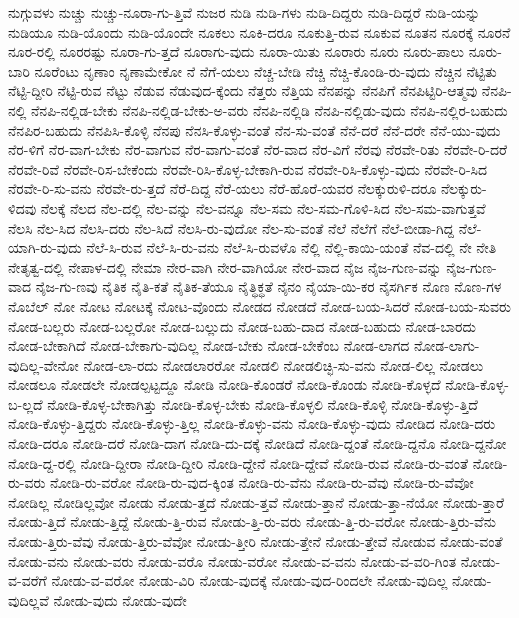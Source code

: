 {ನುಗ್ಗುವಳು
ನುಚ್ಚು
ನುಚ್ಚು-ನೂರಾ-ಗು-ತ್ತಿವೆ
ನುಜರ
ನುಡಿ
ನುಡಿ-ಗಳು
ನುಡಿ-ದಿದ್ದರು
ನುಡಿ-ದಿದ್ದರೆ
ನುಡಿ-ಯನ್ನು
ನುಡಿಯೂ
ನುಡಿ-ಯೊಂದು
ನುಡಿ-ಯೊಂದೇ
ನೂಕಲು
ನೂಕಿ-ದರೂ
ನೂಕುತ್ತಿ-ರುವ
ನೂಕುವ
ನೂತನ
ನೂರಕ್ಕೆ
ನೂರನೆ
ನೂರ-ರಲ್ಲಿ
ನೂರರಷ್ಟು
ನೂರಾ-ಗು-ತ್ತದೆ
ನೂರಾಗು-ವುದು
ನೂರಾ-ಯಿತು
ನೂರಾರು
ನೂರು
ನೂರು-ಪಾಲು
ನೂರು-ಬಾರಿ
ನೂರೆಂಟು
ನೃಣಾಂ
ನೃಣಾಮೇಕೋ
ನೆ
ನೆಗೆ-ಯಲು
ನೆಚ್ಚ-ಬೇಡಿ
ನೆಚ್ಚಿ
ನೆಚ್ಚಿ-ಕೊಂಡಿ-ರು-ವುದು
ನೆಚ್ಚಿನ
ನೆಟ್ಟಿತು
ನೆಟ್ಟಿ-ದ್ದೀರಿ
ನೆಟ್ಟಿ-ರುವ
ನೆಟ್ಟು
ನೆಡುವ
ನೆಡುವುದ-ಕ್ಕೆಂದು
ನೆತ್ತರು
ನೆತ್ತಿಯ
ನೆನಪನ್ನು
ನೆನಪಿಗೆ
ನೆನಪಿಟ್ಟಿರಿ-ಆತ್ಮವು
ನೆನಪಿ-ನಲ್ಲಿ
ನೆನಪಿ-ನಲ್ಲಿಡ-ಬೇಕು
ನೆನಪಿ-ನಲ್ಲಿಡ-ಬೇಕು-ಅ-ವರು
ನೆನಪಿ-ನಲ್ಲಿಡಿ
ನೆನಪಿ-ನಲ್ಲಿಡು-ವುದು
ನೆನಪಿ-ನಲ್ಲಿರ-ಬಹುದು
ನೆನಪಿರ-ಬಹುದು
ನೆನಪಿಸಿ-ಕೊಳ್ಳಿ
ನೆನಪು
ನೆನಸಿ-ಕೊಳ್ಳು-ವಂತೆ
ನೆನ-ಸು-ವಂತೆ
ನೆನೆ-ದರೆ
ನೆನೆ-ದರೇ
ನೆನೆ-ಯು-ವುದು
ನೆರ-ಳಿಗೆ
ನೆರ-ವಾಗ-ಬೇಕು
ನೆರ-ವಾಗುವ
ನೆರ-ವಾಗು-ವಂತೆ
ನೆರ-ವಾದ
ನೆರ-ವಿಗೆ
ನೆರವು
ನೆರವೇ-ರಿತು
ನೆರವೇ-ರಿ-ದರೆ
ನೆರವೇ-ರಿವೆ
ನೆರವೇ-ರಿಸ-ಬೇಕೆಂದು
ನೆರವೇ-ರಿಸಿ-ಕೊಳ್ಳ-ಬೇಕಾಗಿ-ರುವ
ನೆರವೇ-ರಿಸಿ-ಕೊಳ್ಳು-ವುದು
ನೆರವೇ-ರಿ-ಸಿದ
ನೆರವೇ-ರಿ-ಸು-ವನು
ನೆರವೇ-ರು-ತ್ತದೆ
ನೆರೆ-ದಿದ್ದ
ನೆರೆ-ಯಲು
ನೆರೆ-ಹೊರೆ-ಯವರ
ನೆಲಕ್ಕುರುಳಿ-ದರೂ
ನೆಲಕ್ಕುರು-ಳಿದವು
ನೆಲಕ್ಕೆ
ನೆಲದ
ನೆಲ-ದಲ್ಲಿ
ನೆಲ-ವನ್ನು
ನೆಲ-ವನ್ನೂ
ನೆಲ-ಸಮ
ನೆಲ-ಸಮ-ಗೊಳಿ-ಸಿದ
ನೆಲ-ಸಮ-ವಾಗುತ್ತವೆ
ನೆಲಸಿ
ನೆಲ-ಸಿದ
ನೆಲಸಿ-ದರು
ನೆಲ-ಸಿದೆ
ನೆಲಸಿ-ರು-ವುದೋ
ನೆಲ-ಸು-ವಂತೆ
ನೆಲೆ
ನೆಲೆಗೆ
ನೆಲೆ-ಬೀಡಾ-ಗಿದ್ದ
ನೆಲೆ-ಯಾಗಿ-ರು-ವುದು
ನೆಲೆ-ಸಿ-ರುವ
ನೆಲೆ-ಸಿ-ರು-ವನು
ನೆಲೆ-ಸಿ-ರುವಳೊ
ನೆಲ್ಲಿ
ನೆಲ್ಲಿ-ಕಾಯಿ-ಯಂತೆ
ನೆವ-ದಲ್ಲಿ
ನೇ
ನೇತಿ
ನೇತೃತ್ವ-ದಲ್ಲಿ
ನೇಪಾಳ-ದಲ್ಲಿ
ನೇಮಾ
ನೇರ-ವಾಗಿ
ನೇರ-ವಾಗಿಯೋ
ನೇರ-ವಾದ
ನೈಜ
ನೈಜ-ಗುಣ-ವನ್ನು
ನೈಜ-ಗುಣ-ವಾದ
ನೈಜ-ಗು-ಣವು
ನೈತಿಕ
ನೈತಿ-ಕತೆ
ನೈತಿಕ-ತೆಯೂ
ನೈತ್ಧಿಕ್ಧತೆ
ನೈನಂ
ನೈಯಾ-ಯಿ-ಕರ
ನೈಸರ್ಗಿಕ
ನೊಣ
ನೊಣ-ಗಳ
ನೊಬೆಲ್
ನೋ
ನೋಟ
ನೋಟಕ್ಕೆ
ನೋಟ-ವೊಂದು
ನೋಡದ
ನೋಡದೆ
ನೋಡ-ಬಯ-ಸಿದರೆ
ನೋಡ-ಬಯ-ಸುವರು
ನೋಡ-ಬಲ್ಲರು
ನೋಡ-ಬಲ್ಲರೋ
ನೋಡ-ಬಲ್ಲುದು
ನೋಡ-ಬಹು-ದಾದ
ನೋಡ-ಬಹುದು
ನೋಡ-ಬಾರದು
ನೋಡ-ಬೇಕಾಗಿದೆ
ನೋಡ-ಬೇಕಾಗು-ವುದಿಲ್ಲ
ನೋಡ-ಬೇಕು
ನೋಡ-ಬೇಕೆಂಬ
ನೋಡ-ಲಾಗದ
ನೋಡ-ಲಾಗು-ವುದಿಲ್ಲ-ವೇನೋ
ನೋಡ-ಲಾ-ರದು
ನೋಡಲಾರರೋ
ನೋಡಲಿ
ನೋಡಲಿಚ್ಛಿ-ಸು-ವನು
ನೋಡ-ಲಿಲ್ಲ
ನೋಡಲು
ನೋಡಲೂ
ನೋಡಲೇ
ನೋಡಲ್ಪಟ್ಟದ್ದೂ
ನೋಡಿ
ನೋಡಿ-ಕೊಂಡರೆ
ನೋಡಿ-ಕೊಂಡು
ನೋಡಿ-ಕೊಳ್ಳದೆ
ನೋಡಿ-ಕೊಳ್ಳ-ಬ-ಲ್ಲದೆ
ನೋಡಿ-ಕೊಳ್ಳ-ಬೇಕಾಗಿತ್ತು
ನೋಡಿ-ಕೊಳ್ಳ-ಬೇಕು
ನೋಡಿ-ಕೊಳ್ಳಲಿ
ನೋಡಿ-ಕೊಳ್ಳಿ
ನೋಡಿ-ಕೊಳ್ಳು-ತ್ತಿದೆ
ನೋಡಿ-ಕೊಳ್ಳು-ತ್ತಿದ್ದರು
ನೋಡಿ-ಕೊಳ್ಳು-ತ್ತಿಲ್ಲ
ನೋಡಿ-ಕೊಳ್ಳು-ವನು
ನೋಡಿ-ಕೊಳ್ಳು-ವುದು
ನೋಡಿದ
ನೋಡಿ-ದರು
ನೋಡಿ-ದರೂ
ನೋಡಿ-ದರೆ
ನೋಡಿ-ದಾಗ
ನೋಡಿ-ದು-ದಕ್ಕೆ
ನೋಡಿದೆ
ನೋಡಿ-ದ್ದಂತೆ
ನೋಡಿ-ದ್ದನೊ
ನೋಡಿ-ದ್ದನೋ
ನೋಡಿ-ದ್ದ-ರಲ್ಲಿ
ನೋಡಿ-ದ್ದೀರಾ
ನೋಡಿ-ದ್ದೀರಿ
ನೋಡಿ-ದ್ದೇನೆ
ನೋಡಿ-ದ್ದೇವೆ
ನೋಡಿ-ರುವ
ನೋಡಿ-ರು-ವಂತೆ
ನೋಡಿ-ರು-ವರು
ನೋಡಿ-ರು-ವರೋ
ನೋಡಿ-ರು-ವುದ-ಕ್ಕಿಂತ
ನೋಡಿ-ರು-ವೆನು
ನೋಡಿ-ರು-ವೆವು
ನೋಡಿ-ರು-ವೆವೋ
ನೋಡಿಲ್ಲ
ನೋಡಿಲ್ಲವೋ
ನೋಡು
ನೋಡು-ತ್ತದೆ
ನೋಡು-ತ್ತವೆ
ನೋಡು-ತ್ತಾನೆ
ನೋಡು-ತ್ತಾ-ನೆಯೋ
ನೋಡು-ತ್ತಾರೆ
ನೋಡು-ತ್ತಿದೆ
ನೋಡು-ತ್ತಿದ್ದೆ
ನೋಡು-ತ್ತಿ-ರುವ
ನೋಡು-ತ್ತಿ-ರು-ವರು
ನೋಡು-ತ್ತಿ-ರು-ವರೋ
ನೋಡು-ತ್ತಿರು-ವೆನು
ನೋಡು-ತ್ತಿರು-ವೆವು
ನೋಡು-ತ್ತಿರು-ವೆವೋ
ನೋಡು-ತ್ತೀರಿ
ನೋಡು-ತ್ತೇನೆ
ನೋಡು-ತ್ತೇವೆ
ನೋಡುವ
ನೋಡು-ವಂತೆ
ನೋಡು-ವನು
ನೋಡು-ವರು
ನೋಡು-ವರೊ
ನೋಡು-ವರೋ
ನೋಡು-ವ-ವನು
ನೋಡು-ವ-ವರಿ-ಗಿಂತ
ನೋಡು-ವ-ವರೆಗೆ
ನೋಡು-ವ-ವರೋ
ನೋಡು-ವಿರಿ
ನೋಡು-ವುದಕ್ಕೆ
ನೋಡು-ವುದ-ರಿಂದಲೇ
ನೋಡು-ವುದಿಲ್ಲ
ನೋಡು-ವುದಿಲ್ಲವೆ
ನೋಡು-ವುದು
ನೋಡು-ವುದೇ
}
